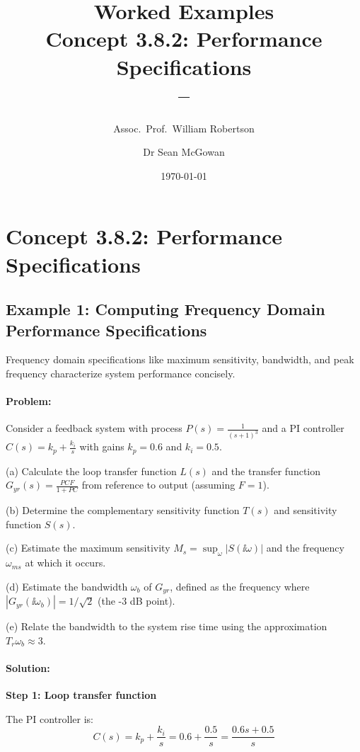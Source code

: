 \documentclass[11pt,a4paper]{article}
\title{\textbf{Worked Examples}\\[0.5em]
\large Concept 3.8.2: Performance Specifications\\[0.3em]
\normalsize \coursesubtitle{} -- \coursetitle}
\author{Assoc.\ Prof.\ William Robertson \and Dr Sean McGowan}
\date{\today}
\begin{document}
\maketitle
\tableofcontents
\newpage

\section{Concept 3.8.2: Performance Specifications}

\subsection{Example 1: Computing Frequency Domain Performance Specifications}

Frequency domain specifications like maximum sensitivity, bandwidth, and peak frequency characterize system performance concisely.

\paragraph{Problem:} 
Consider a feedback system with process $P(s) = \frac{1}{(s+1)^3}$ and a PI controller $C(s) = k_p + \frac{k_i}{s}$ with gains $k_p = 0.6$ and $k_i = 0.5$.

(a) Calculate the loop transfer function $L(s)$ and the transfer function $G_{yr}(s) = \frac{PCF}{1+PC}$ from reference to output (assuming $F = 1$).

(b) Determine the complementary sensitivity function $T(s)$ and sensitivity function $S(s)$.

(c) Estimate the maximum sensitivity $M_s = \sup_\omega |S(\ii\omega)|$ and the frequency $\omega_{ms}$ at which it occurs.

(d) Estimate the bandwidth $\omega_b$ of $G_{yr}$, defined as the frequency where $|G_{yr}(\ii\omega_b)| = 1/\sqrt{2}$ (the -3 dB point).

(e) Relate the bandwidth to the system rise time using the approximation $T_r \omega_b \approx 3$.

\paragraph{Solution:}

\textbf{Step 1: Loop transfer function}

The PI controller is:
\begin{equation}
	C(s) = k_p + \frac{k_i}{s} = 0.6 + \frac{0.5}{s} = \frac{0.6s + 0.5}{s}
\end{equation}
\end{document}
